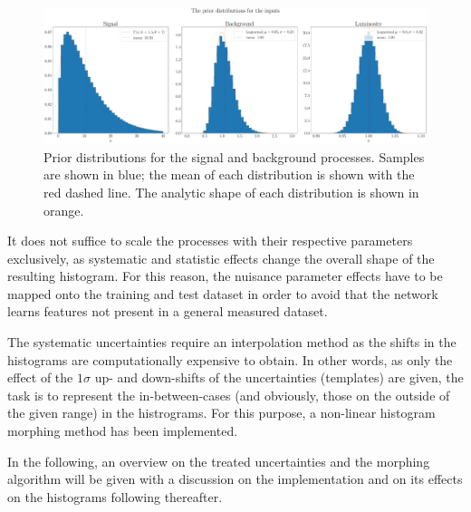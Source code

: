 \begin{figure}[h!]
	\centering
	\includegraphics[width=\linewidth]{figures/network_setup/priors.pdf}
	\caption{Prior distributions for the signal and background processes. Samples are shown in blue; the mean of each distribution is shown with the red dashed line. The analytic shape of each distribution is shown in orange.}
	\label{fig:priors}
\end{figure}

It does not suffice to scale the processes with their respective parameters exclusively, as systematic and statistic effects change the overall shape of the resulting histogram. For this reason, the nuisance parameter effects have to be mapped onto the training and test dataset in order to avoid that the network learns features not present in a general measured dataset.


The systematic uncertainties require an interpolation method as the shifts in the histograms are computationally expensive to obtain. In other words, as only the effect of the $1\sigma$ up- and down-shifts of the uncertainties (templates) are given, the task is to represent the in-between-cases (and obviously, those on the outside of the given range) in the histrograms. For this purpose, a non-linear histogram morphing method has been implemented.

In the following, an overview on the treated uncertainties and the morphing algorithm will be given with a discussion on the implementation and on its effects on the histograms following thereafter.

